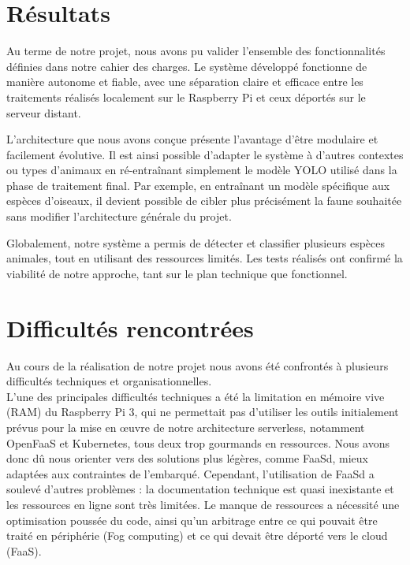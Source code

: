 \documentclass[a4paper,11pt]{article}
\begin{document}
	\section{Résultats}
	Au terme de notre projet, nous avons pu valider l’ensemble des fonctionnalités définies dans notre cahier des charges. Le système développé fonctionne de manière autonome et fiable, avec une séparation claire et efficace entre les traitements réalisés localement sur le Raspberry Pi et ceux déportés sur le serveur distant.
	
	L’architecture que nous avons conçue présente l’avantage d’être modulaire et facilement évolutive. Il est ainsi possible d’adapter le système à d’autres contextes ou types d’animaux en ré-entraînant simplement le modèle YOLO utilisé dans la phase de traitement final. Par exemple, en entraînant un modèle spécifique aux espèces d’oiseaux, il devient possible de cibler plus précisément la faune souhaitée sans modifier l’architecture générale du projet.
	
	Globalement, notre système a permis de détecter et classifier plusieurs espèces animales, tout en utilisant des ressources limités. Les tests réalisés ont confirmé la viabilité de notre approche, tant sur le plan technique que fonctionnel.


	\section{Difficultés rencontrées}
	Au cours de la réalisation de notre projet nous avons été confrontés à plusieurs difficultés techniques et organisationnelles.\\
	
	L'une des principales difficultés techniques a été la limitation en mémoire vive (RAM) du Raspberry Pi 3, qui ne permettait pas d'utiliser les outils initialement prévus pour la mise en œuvre de notre architecture serverless, notamment OpenFaaS et Kubernetes, tous deux trop gourmands en ressources. Nous avons donc dû nous orienter vers des solutions plus légères, comme FaaSd, mieux adaptées aux contraintes de l’embarqué. Cependant, l’utilisation de FaaSd a soulevé d'autres problèmes : la documentation technique est quasi inexistante et les ressources en ligne sont très limitées. Le manque de ressources a nécessité une optimisation poussée du code, ainsi qu’un arbitrage entre ce qui pouvait être traité en périphérie (Fog computing) et ce qui devait être déporté vers le cloud (FaaS).\\
	
\end{document}
